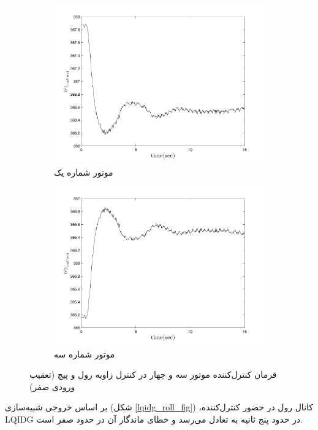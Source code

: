 \begin{figure}
	[width=12cm]
	\centering
	\begin{subfigure}
		\centering
		\includegraphics[width=12cm]{../Figures/Calibration/LQIDG/Pitch/lqidg_Omega_1.png}
		\caption{موتور شماره یک}
	\end{subfigure}
	\begin{subfigure}
		\centering
		\includegraphics[width=12cm]{../Figures/Calibration/LQIDG/Pitch/lqidg_Omega_3.png}
		\caption{موتور شماره سه}
	\end{subfigure}
	\caption{‫‪فرمان کنترل‌کننده موتور سه و چهار در کنترل زاویه رول و پیچ (تعقیب ورودی صفر)}
\end{figure}
بر اساس خروجی شبیه‌سازی (شکل
\ref{lqidg_roll_fig})
،کانال رول در حضور کنترل‌کننده LQIDG در حدود پنج ثانیه به تعادل می‌رسد و خطای ماندگار آن در حدود صفر است.